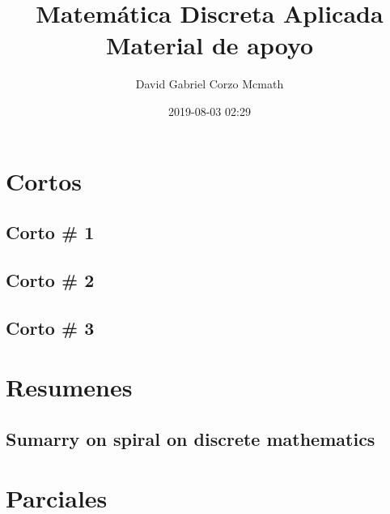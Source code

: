 \documentclass[openany]{book}
\author{David Gabriel Corzo Mcmath}
\title{Matemática Discreta Aplicada \\ \normalsize Material de apoyo}
\date{2019-08-03 02:29}
\begin{document}
\maketitle
\tableofcontents


\part{Cortos}
\chapter{Corto \# 1}


\chapter{Corto \# 2}
% 

\chapter{Corto \# 3}




\part{Resumenes}
\chapter{Sumarry on spiral on discrete mathematics}



\part{Parciales}


\end{document}
